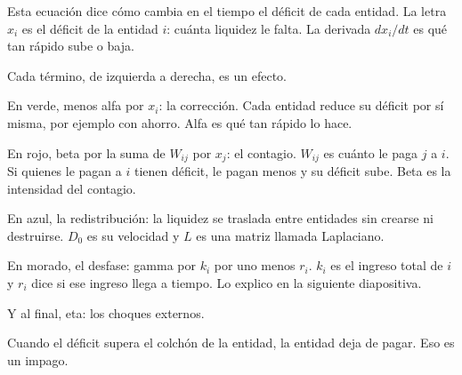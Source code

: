 \begin{decir}
Esta ecuación dice cómo cambia en el tiempo el déficit de cada entidad. La letra $x_i$
es el déficit de la entidad $i$: cuánta liquidez le falta. La derivada $dx_i/dt$ es qué
tan rápido sube o baja.

Cada término, de izquierda a derecha, es un efecto.

En verde, menos alfa por $x_i$: la corrección. Cada entidad reduce su déficit por sí
misma, por ejemplo con ahorro. Alfa es qué tan rápido lo hace.

En rojo, beta por la suma de $W_{ij}$ por $x_j$: el contagio. $W_{ij}$ es cuánto le paga
$j$ a $i$. Si quienes le pagan a $i$ tienen déficit, le pagan menos y su déficit sube.
Beta es la intensidad del contagio.

En azul, la redistribución: la liquidez se traslada entre entidades sin crearse ni
destruirse. $D_0$ es su velocidad y $L$ es una matriz llamada Laplaciano.

En morado, el desfase: gamma por $k_i$ por uno menos $r_i$. $k_i$ es el ingreso total de
$i$ y $r_i$ dice si ese ingreso llega a tiempo. Lo explico en la siguiente diapositiva.

Y al final, eta: los choques externos.

Cuando el déficit supera el colchón de la entidad, la entidad deja de pagar. Eso es un
impago.
\end{decir}
